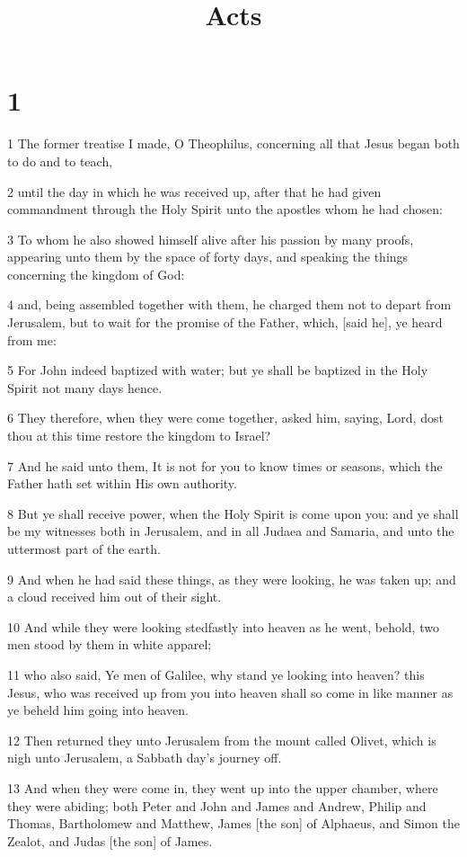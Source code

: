 

\title{Acts}

\chapter{1}

\par 1 The former treatise I made, O Theophilus, concerning all that Jesus began both to do and to teach,
\par 2 until the day in which he was received up, after that he had given commandment through the Holy Spirit unto the apostles whom he had chosen:
\par 3 To whom he also showed himself alive after his passion by many proofs, appearing unto them by the space of forty days, and speaking the things concerning the kingdom of God:
\par 4 and, being assembled together with them, he charged them not to depart from Jerusalem, but to wait for the promise of the Father, which, [said he], ye heard from me:
\par 5 For John indeed baptized with water; but ye shall be baptized in the Holy Spirit not many days hence.
\par 6 They therefore, when they were come together, asked him, saying, Lord, dost thou at this time restore the kingdom to Israel?
\par 7 And he said unto them, It is not for you to know times or seasons, which the Father hath set within His own authority.
\par 8 But ye shall receive power, when the Holy Spirit is come upon you: and ye shall be my witnesses both in Jerusalem, and in all Judaea and Samaria, and unto the uttermost part of the earth.
\par 9 And when he had said these things, as they were looking, he was taken up; and a cloud received him out of their sight.
\par 10 And while they were looking stedfastly into heaven as he went, behold, two men stood by them in white apparel;
\par 11 who also said, Ye men of Galilee, why stand ye looking into heaven? this Jesus, who was received up from you into heaven shall so come in like manner as ye beheld him going into heaven.
\par 12 Then returned they unto Jerusalem from the mount called Olivet, which is nigh unto Jerusalem, a Sabbath day's journey off.
\par 13 And when they were come in, they went up into the upper chamber, where they were abiding; both Peter and John and James and Andrew, Philip and Thomas, Bartholomew and Matthew, James [the son] of Alphaeus, and Simon the Zealot, and Judas [the son] of James.
